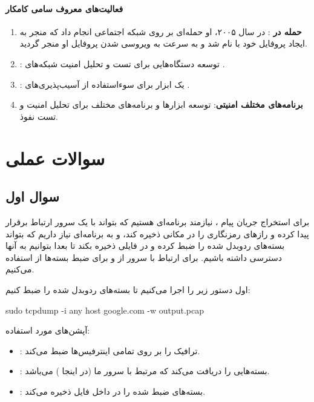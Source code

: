 \documentclass{report}
\begin{document}
\subsubsection*{فعالیت‌های معروف سامی کامکار}
\begin{enumerate}
	\item \textbf{حمله  در }:
	 در سال ۲۰۰۵، او حمله‌ای  بر روی شبکه اجتماعی  انجام داد که منجر به ایجاد پروفایل خود با نام  شد و به سرعت به ویروسی شدن پروفایل او منجر گردید.
	\item \textbf{}:
	 توسعه دستگاه‌هایی برای تست و تحلیل امنیت شبکه‌های .
	\item \textbf{}:
	یک ابزار برای سوءاستفاده از آسیب‌پذیری‌های .
	\item \textbf{برنامه‌های مختلف امنیتی}:
	 توسعه ابزارها و برنامه‌های مختلف برای تحلیل امنیت و تست نفوذ.
\end{enumerate}

\chapter{سوالات عملی}

\section{سوال اول}

برای استخراج جریان پیام ، نیازمند برنامه‌ای هستیم که بتواند با یک سرور ارتباط برقرار پیدا کرده و رازهای رمزنگاری را در مکانی ذخیره کند، و به برنامه‌ای نیاز داریم که بتواند بسته‌های ردوبدل شده را ضبط کرده و در فایلی ذخیره بکند تا بعدا بتوانیم به آنها دسترسی داشته باشیم. برای ارتباط با سرور از  و برای ضبط بسته‌ها از  استفاده می‌کنیم.

اول دستور زیر را اجرا می‌کنیم تا بسته‌های ردوبدل شده را ضبط کنیم:
\begin{LTR}
	\begin{latin}
		sudo tcpdump -i any host google.com -w output.pcap
	\end{latin}
\end{LTR}

\noindent
آپشن‌های مورد استفاده:
\begin{itemize}
	\item
	:
	ترافیک را بر روی تمامی اینترفیس‌ها ضبط می‌کند.
	\item 
	:
	بسته‌هایی را دریافت می‌کند که مرتبط با سرور ما (در اینجا ) می‌باشد.
	\item 
	:
	بسته‌های ضبط شده را در داخل فایل  ذخیره می‌کند.
\end{itemize}
\end{document}
